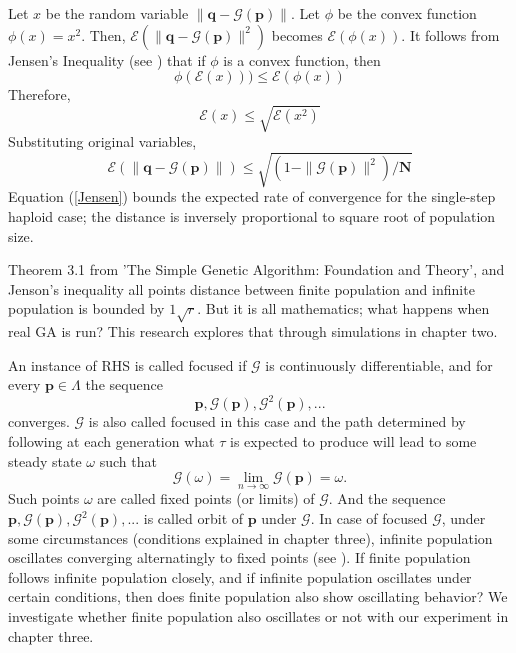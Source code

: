 Let $x$ be the random variable $\| \bm{q} - \mathcal{G}(\bm{p}) \|$. Let $\phi$ be the convex function $\phi (x) = x^2$. 
Then, $\mathcal{E}(\| \bm{q} - \mathcal{G}(\bm{p}) \|^2)$ becomes $\mathcal{E}(\phi (x))$. 
It follows from Jensen's Inequality (see \cite{JensenInequality}) that 
if $\phi$ is a convex function, then
\[
\phi(\mathcal{E}(x))) \leq \mathcal{E}(\phi(x)) 
\]
Therefore,
\[
\mathcal{E}(x) \leq \sqrt{\mathcal{E}(x^2)}
\]
Substituting original variables,
\begin{equation}
\label{Jensen}
\mathcal{E}(\| \bm{q} - \mathcal{G}(\bm{p}) \|) \leq \sqrt{(1 - \|\mathcal{G}(\bm{p})\|^2) / \bm{N}}
\end{equation}
Equation (\ref{Jensen}) bounds the expected rate of convergence for the single-step haploid case; 
the distance is inversely proportional to square root of population size.

Theorem 3.1 from 'The Simple Genetic Algorithm: Foundation and Theory', 
and Jenson's inequality all points distance between finite population and infinite population is bounded 
by $1\sqrt{r}$. But it is all mathematics; what happens when real GA is run? This research explores that 
through simulations in chapter two.

An instance of RHS is called focused if $\mathcal{G}$ is continuously differentiable, and for every $\bm{p}  \in  \Lambda$
the sequence
\[
\bm{p},  \mathcal{G}(\bm{p}),  {\mathcal{G}}^2(\bm{p}),...
\]
converges. $\mathcal{G}$ is also called focused in this case and the path determined by following at each generation what $\tau$ is expected 
to produce will lead to some steady state $\omega$ such that
\[
\mathcal{G}(\omega) = \lim_{n\to\infty} \mathcal{G}(\bm{p}) = \omega.
\]
Such points $\omega$ are called fixed points (or limits) of $\mathcal{G}$. 
And the sequence $\bm{p},  \mathcal{G}(\bm{p}),  {\mathcal{G}}^2(\bm{p}),...$ is called orbit of $\bm{p}$ under $\mathcal{G}$. 
In case of focused $\mathcal{G}$, under some circumstances (conditions explained in chapter three), 
infinite population oscillates converging alternatingly to fixed points (see \cite{Vose1999}). 
If finite population follows infinite population closely, and if infinite population oscillates under certain conditions, then 
does finite population also show oscillating behavior? We investigate whether finite population also oscillates or not with our experiment 
in chapter three. 

